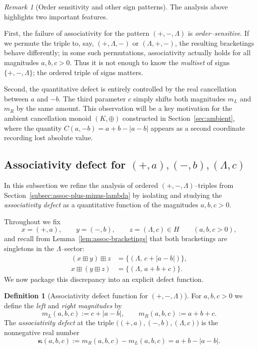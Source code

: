 \documentclass[11pt]{amsart}
\numberwithin{equation}{section}
\theoremstyle{definition}
\newtheorem{definition}[theorem]{Definition}
\theoremstyle{remark}
\newtheorem{remark}[theorem]{Remark}
\newcommand{\Hnum}{H}                      %
\newcommand{\AssocCurv}{\boldsymbol{\kappa}} %
\newcommand{\Kamb}{K}                      %
\newcommand{\op}{\boxplus}                 %
\newcommand{\Cfun}{C}                      %
\begin{document}
\begin{remark}[Order sensitivity and other sign patterns]
\label{rem:order-sensitivity}
The analysis above highlights two important features.

First, the failure of associativity for the pattern $(+,-,\Lambda)$ is
\emph{order--sensitive}.  If we permute the triple to, say,
$(+, \Lambda, -)$ or $(\Lambda,+,-)$, the resulting bracketings behave
differently; in some such permutations, associativity actually holds
for all magnitudes $a,b,c>0$.  Thus it is not enough to know the
\emph{multiset} of signs $\{+,-,\Lambda\}$; the ordered triple of signs
matters.

Second, the quantitative defect is entirely controlled by the real
cancellation between $a$ and $-b$.  The third parameter $c$ simply
shifts both magnitudes $m_L$ and $m_R$ by the same amount.  This
observation will be a key motivation for the ambient cancellation
monoid $(\Kamb,\oplus)$ constructed in
Section~\ref{sec:ambient}, where the quantity
$\Cfun(a,-b)=a+b-|a-b|$ appears as a second coordinate recording lost
absolute value.
\end{remark}

\subsection{Associativity defect for $(+,a),(-,b),(\Lambda,c)$}
\label{subsec:assoc-defect-quantitative}

In this subsection we refine the analysis of ordered $(+,-,\Lambda)$–triples
from Section~\ref{subsec:assoc-plus-minus-lambda} by isolating and
studying the \emph{associativity defect} as a quantitative function of
the magnitudes $a,b,c>0$.

Throughout we fix
\[
  x=(+,a),\qquad y=(-,b),\qquad z=(\Lambda,c)\in\Hnum
  \qquad(a,b,c>0),
\]
and recall from Lemma~\ref{lem:assoc-bracketings} that both bracketings
are singletons in the $\Lambda$–sector:
\begin{align*}
  (x\op y)\op z
  &= \{(\Lambda,\,c+|a-b|)\},\\[2pt]
  x\op(y\op z)
  &= \{(\Lambda,\,a+b+c)\}.
\end{align*}
We now package this discrepancy into an explicit defect function.

\begin{definition}[Associativity defect function for $(+,-,\Lambda)$]
\label{def:defect-function}
For $a,b,c>0$ we define the \emph{left} and \emph{right magnitudes} by
\[
  m_L(a,b,c)
  := c+|a-b|,\qquad
  m_R(a,b,c)
  := a+b+c.
\]
The \emph{associativity defect} at the triple
$\bigl((+,a),(-,b),(\Lambda,c)\bigr)$ is the nonnegative real number
\[
  \AssocCurv(a,b,c)
  := m_R(a,b,c)-m_L(a,b,c)
  = a+b-|a-b|.
\]
\end{definition}
\end{document}
